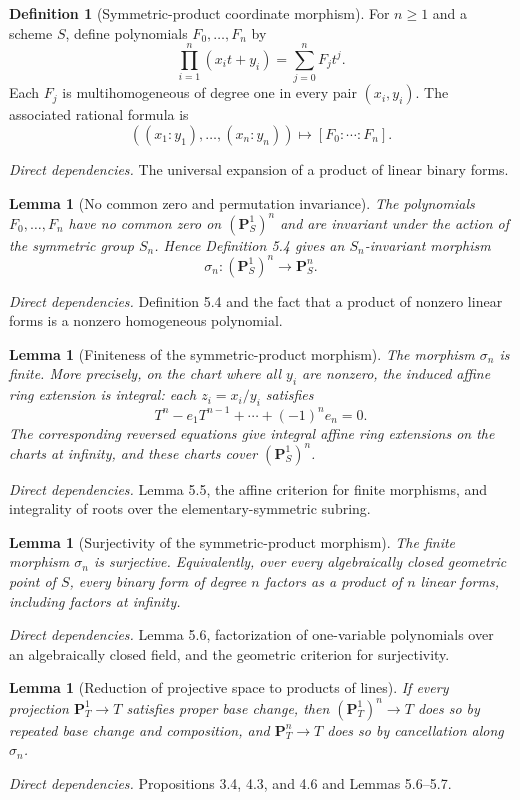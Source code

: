 \documentclass[10pt]{article}
\newtheorem{lemma}[theorem]{Lemma}
\theoremstyle{definition}
\newtheorem{definition}[theorem]{Definition}
\newcommand{\deps}[1]{\par\smallskip\textit{Direct dependencies.} #1\par}
\begin{document}
\begin{definition}[Symmetric-product coordinate morphism]
For $n\geq1$ and a scheme $S$, define polynomials $F_0,\dots,F_n$ by
\[
 \prod_{i=1}^n(x_it+y_i)=\sum_{j=0}^nF_jt^j.
\]
Each $F_j$ is multihomogeneous of degree one in every pair $(x_i,y_i)$.
The associated rational formula is
\[
 ((x_1:y_1),\dots,(x_n:y_n))\longmapsto[F_0:\cdots:F_n].
\]
\end{definition}
\deps{The universal expansion of a product of linear binary forms.}

\begin{lemma}[No common zero and permutation invariance]
The polynomials $F_0,\dots,F_n$ have no common zero on
$(\mathbf P^1_S)^n$ and are invariant under the action of the symmetric
group $S_n$.  Hence Definition 5.4 gives an $S_n$-invariant morphism
\[
 \sigma_n:(\mathbf P^1_S)^n\longrightarrow\mathbf P^n_S.
\]
\end{lemma}
\deps{Definition 5.4 and the fact that a product of nonzero linear forms
is a nonzero homogeneous polynomial.}

\begin{lemma}[Finiteness of the symmetric-product morphism]
The morphism $\sigma_n$ is finite.  More precisely, on the chart where all
$y_i$ are nonzero, the induced affine ring extension is integral: each
$z_i=x_i/y_i$ satisfies
\[
 T^n-e_1T^{n-1}+\cdots+(-1)^ne_n=0.
\]
The corresponding reversed equations give integral affine ring extensions
on the charts at infinity, and these charts cover $(\mathbf P^1_S)^n$.
\end{lemma}
\deps{Lemma 5.5, the affine criterion for finite morphisms, and integrality
of roots over the elementary-symmetric subring.}

\begin{lemma}[Surjectivity of the symmetric-product morphism]
The finite morphism $\sigma_n$ is surjective.  Equivalently, over every
algebraically closed geometric point of $S$, every binary form of degree
$n$ factors as a product of $n$ linear forms, including factors at
infinity.
\end{lemma}
\deps{Lemma 5.6, factorization of one-variable polynomials over an
algebraically closed field, and the geometric criterion for surjectivity.}

\begin{lemma}[Reduction of projective space to products of lines]
If every projection $\mathbf P^1_T\to T$ satisfies proper base change,
then $(\mathbf P^1_T)^n\to T$ does so by repeated base change and
composition, and $\mathbf P^n_T\to T$ does so by cancellation along
$\sigma_n$.
\end{lemma}
\deps{Propositions 3.4, 4.3, and 4.6 and Lemmas 5.6--5.7.}
\end{document}
